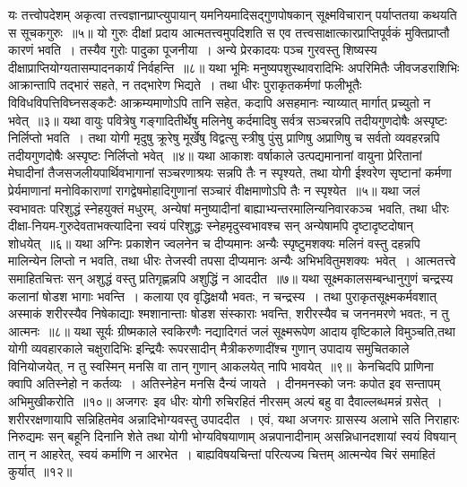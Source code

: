 \indent  यः तत्त्वोपदेशम् अकृत्वा तत्त्वज्ञानप्राप्त्युपायान् यमनियमादिसद्गुणपोषकान् सूक्ष्मविचारान् पर्याप्ततया कथयति स सूचकगुरुः~॥५॥
\indent  यो गुरुः दीक्षां प्रदाय आत्मतत्त्वमुपदिशति स एव तत्त्वसाक्षात्कारप्राप्तिपूर्वकं मुक्तिप्राप्तौ कारणं भवति~। तस्यैव गुरोः पादुका पूजनीया~। अन्ये प्रेरकादयः पञ्च गुरवस्तु शिष्यस्य दीक्षाप्राप्तियोग्यतासम्पादनकार्यं  निर्वहन्ति~॥८॥
\indent  यथा भूमिः मनुष्यपशुस्थावरादिभिः अपरिमितैः जीवजडराशिभिः आक्रान्तापि तद्भारं सहते, न तद्भारेण भिद्यते~। तथा धीरः पुराकृतकर्मणां फलीभूतैः विविधविपत्तिविघ्नसङ्कटैः आक्रम्यमाणोऽपि तानि सहेत, कदापि असहमानः न्याय्यात् मार्गात् प्रच्युतो न भवेत्~॥३॥ 
\indent  यथा वायुः पवित्रेषु गङ्गादितीर्थेषु मलिनेषु कर्दमादिषु सर्वत्र  सञ्चरन्नपि तदीयगुणदोषैः अस्पृष्टः निर्लिप्तो भवति~। तथा योगी मृदुषु क्रूरेषु मूर्खेषु विद्वत्सु स्त्रीषु पुंसु प्राणिषु अप्राणिषु च  सर्वतो व्यवहरन्नपि तदीयगुणदोषैः अस्पृष्टः निर्लिप्तो भवेत्~॥४॥
\indent  यथा आकाशः वर्षाकाले उत्पद्यमानानां वायुना प्रेरितानां मेघादीनां तैजसजलीयपार्थिवभागानां सञ्चरणाश्रयः सन्नपि तैः न स्पृश्यते, तथा योगी ईश्वरेण सृष्टानां कर्मणा प्रेर्यमाणानां मनोविकाराणां रागद्वेषमोहादिगुणानां सञ्चारं वीक्षमाणोऽपि तैः न स्पृश्येत~॥५॥
\indent  यथा जलं स्वभावतः परिशुद्धं स्नेहयुक्तं मधुरम्, अन्येषां मनुष्यादीनां बाह्याभ्यन्तरमालिन्यनिवारकञ्च\footB\ भवति, तथा धीरः दीक्षा-नियम-गुरुदेवताभक्त्यादिना स्वयं परिशुद्धः स्नेहमृदुस्वभावश्च सन् अन्येषामपि दृष्टादृष्टदोषान् शोधयेत्~॥६॥
\indent  यथा अग्निः प्रकाशेन ज्वलनेन च दीप्यमानः अन्यैः स्पृष्टुमशक्यः मलिनं वस्तु दहन्नपि मालिन्येन लिप्तो न भवति,  तथा धीरः तेजस्वी  तपसा दीप्यमानः अन्यैः अभिभवितुमशक्यः\footB\ भवेत्~। आत्मतत्त्वे समाहितचित्तः सन् अशुद्धं वस्तु प्रतिगृह्णन्नपि अशुद्धिं न आददीत~॥७॥
\indent  यथा सूक्ष्मकालसम्बन्धानुगुणं चन्द्रस्य कलानां षोडश भागाः भवन्ति~। कलाया एव वृद्धिक्षयौ भवतः, न चन्द्रस्य~। तथा पुराकृतसूक्ष्मकर्मवशात् अस्माकं शरीरस्यैव निषेकाद्याः श्मशानान्ताः षोडश संस्काराः भवन्ति, शरीरस्यैव च जननमरणे भवतः, न तु आत्मनः~॥८॥
\indent  यथा सूर्यः ग्रीष्मकाले स्वकिरणैः नद्यादिगतं जलं सूक्ष्मरूपेण आदाय वृष्टिकाले विमुञ्चति,तथा योगी व्यवहारकाले चक्षुरादिभिः इन्द्रियैः रूपरसादीन् मैत्रीकरुणादींश्च गुणान् उपादाय समुचितकाले विनियोजयेत्, न तु स्वस्मिन् मनसि वा तान् गुणान् आकलयेत् नापि भावयेत्~॥९॥\footB\
\indent  केनचिदपि प्राणिना क्वापि अतिस्नेहो न कर्तव्यः~। अतिस्नेहेन मनसि दैन्यं जायते~। दीनमनस्को जनः कपोत इव सन्तापम् अभिमुखीकरोति\footB\ ॥१०॥
\indent  अजगरः\footB\  इव धीरः योगी रुचिरहितं नीरसम् अल्पं बहु वा दैवाल्लब्धमन्नं ग्रसेत्~। शरीररक्षणायापि सन्निहितमेव अन्नादिभोग्यवस्तु उपाददीत~। एवं, यथा अजगरः ग्रासस्य अलाभे सति निराहारः निरुद्यमः सन् बहूनि दिनानि शेते  तथा योगी भोग्यविषयाणाम्  अन्नपानादीनाम् असन्निधानदशायां स्वयं विषयान्  तान् न आहरेत्, स्वयं कर्माणि न आरभेत~। बाह्यविषयचिन्तां परित्यज्य चित्तम् आत्मन्येव चिरं समाहितं कुर्यात्~॥१२॥
